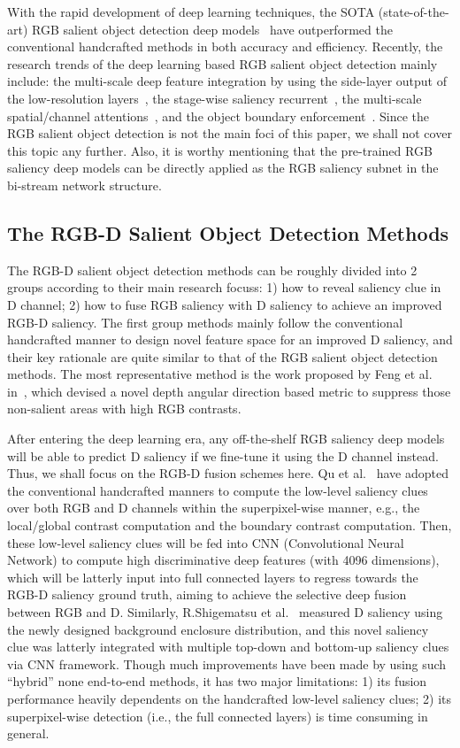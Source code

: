 \documentclass[journal]{IEEEtran}
\begin{document}
With the rapid development of deep learning techniques, the SOTA (state-of-the-art) RGB salient object detection deep models~\cite{wang2015deep,lee2016deep,li2018contrast} have outperformed the conventional handcrafted methods in both accuracy and efficiency.
Recently, the research trends of the deep learning based RGB salient object detection mainly include: the multi-scale deep feature integration by using the side-layer output of the low-resolution layers~\cite{DSS}, the stage-wise saliency recurrent~\cite{zhang2017amulet}, the multi-scale spatial/channel attentions~\cite{li2019video}, and the object boundary enforcement~\cite{EGNet}.
Since the RGB salient object detection is not the main foci of this paper, we shall not cover this topic any further.
Also, it is worthy mentioning that the pre-trained RGB saliency deep models can be directly applied as the RGB saliency subnet in the bi-stream network structure.

\subsection{The RGB-D Salient Object Detection Methods}
The RGB-D salient object detection methods can be roughly divided into 2 groups according to their main research focuss: 1) how to reveal saliency clue in D channel; 2) how to fuse RGB saliency with D saliency to achieve an improved RGB-D saliency.
The first group methods mainly follow the conventional handcrafted manner to design novel feature space for an improved D saliency, and their key rationale are quite similar to that of the RGB salient object detection methods.
The most representative method is the work proposed by Feng et al. in~\cite{CVPR_F2016}, which devised a novel depth angular direction based metric to suppress those non-salient areas with high RGB contrasts.

After entering the deep learning era, any off-the-shelf RGB saliency deep models will be able to predict D saliency if we fine-tune it using the D channel instead.
Thus, we shall focus on the RGB-D fusion schemes here.
Qu et al.~\cite{TIP_Q2017} have adopted the conventional handcrafted manners to compute the low-level saliency clues over both RGB and D channels within the superpixel-wise manner, e.g., the local/global contrast computation and the boundary contrast computation.
Then, these low-level saliency clues will be fed into CNN (Convolutional Neural Network) to compute high discriminative deep features (with 4096 dimensions), which will be latterly input into full connected layers to regress towards the RGB-D saliency ground truth, aiming to achieve the selective deep fusion between RGB and D.
Similarly, R.Shigematsu et al.~\cite{shigematsu2017learning} measured D saliency using the newly designed background enclosure distribution, and this novel saliency clue was latterly integrated with multiple top-down and bottom-up saliency clues via CNN framework.
Though much improvements have been made by using such ``hybrid'' none end-to-end methods, it has two major limitations: 1) its fusion performance heavily dependents on the handcrafted low-level saliency clues; 2) its superpixel-wise detection (i.e., the full connected layers) is time consuming in general.
\end{document}

